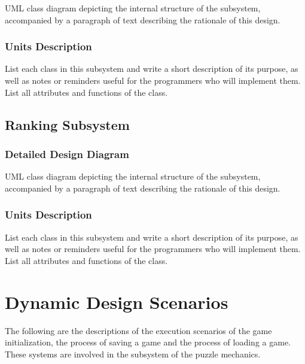 \documentclass[12pt]{article}
\begin{document}
UML class diagram depicting the internal structure of the subsystem,
accompanied by a paragraph of text describing the rationale of this design.

\subsubsection{Units Description}

List each class in this subsystem and write a short description of its purpose,
as well as notes or reminders useful for the programmers who will implement them.
List all attributes and functions of the class.

\newpage

\subsection{Ranking Subsystem}

\subsubsection{Detailed Design Diagram}

UML class diagram depicting the internal structure of the subsystem,
accompanied by a paragraph of text describing the rationale of this design.

\subsubsection{Units Description}

List each class in this subsystem and write a short description of its purpose,
as well as notes or reminders useful for the programmers who will implement them.
List all attributes and functions of the class.

\newpage

\section{Dynamic Design Scenarios}
The following are the descriptions of the execution scenarios of the game initialization, the process of saving a game and the process of loading a game. These systems are involved in the subsystem of the puzzle mechanics.
\end{document}
